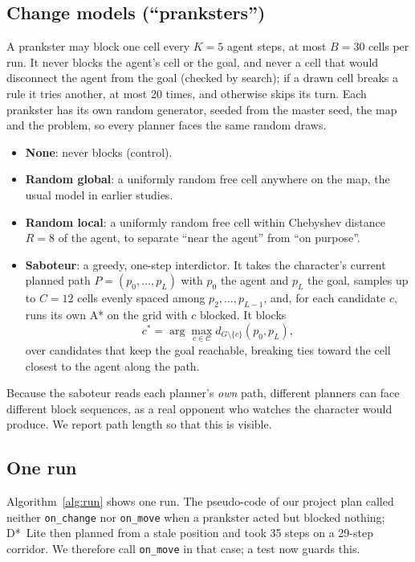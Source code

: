 \documentclass[conference,12pt]{IEEEtran}
\newcommand{\dstar}{D*~Lite}
\begin{document}
\subsection{Change models (``pranksters'')}
\label{sec:pranksters}
A prankster may block one cell every $K=5$ agent steps, at most $B=30$ cells per run. It never
blocks the agent's cell or the goal, and never a cell that would disconnect the agent from the
goal (checked by search); if a drawn cell breaks a rule it tries another, at most 20 times,
and otherwise skips its turn. Each prankster has its own random generator, seeded from the
master seed, the map and the problem, so every planner faces the same random draws.
\begin{itemize}
\item \textbf{None}: never blocks (control).
\item \textbf{Random global}: a uniformly random free cell anywhere on the map, the usual model
      in earlier studies.
\item \textbf{Random local}: a uniformly random free cell within Chebyshev distance $R=8$ of the
      agent, to separate ``near the agent'' from ``on purpose''.
\item \textbf{Saboteur}: a greedy, one-step interdictor. It takes the character's current planned
      path $P=(p_0,\dots,p_L)$ with $p_0$ the agent and $p_L$ the goal, samples up to $C=12$
      cells evenly spaced among $p_2,\dots,p_{L-1}$, and, for each candidate $c$, runs its own A*
      on the grid with $c$ blocked. It blocks
      \begin{equation}
      c^{*}=\arg\max_{c\in\mathcal{C}} d_{G\setminus\{c\}}(p_0,p_L),
      \end{equation}
      over candidates that keep the goal reachable, breaking ties toward the cell closest to the
      agent along the path.
\end{itemize}
Because the saboteur reads each planner's \emph{own} path, different planners can face different
block sequences, as a real opponent who watches the character would produce. We report path
length so that this is visible.

\subsection{One run}
Algorithm~\ref{alg:run} shows one run. The pseudo-code of our project plan called neither
\texttt{on\_change} nor \texttt{on\_move} when a prankster acted but blocked nothing; \dstar{}
then planned from a stale position and took 35 steps on a 29-step corridor. We therefore call
\texttt{on\_move} in that case; a test now guards this.
\end{document}
